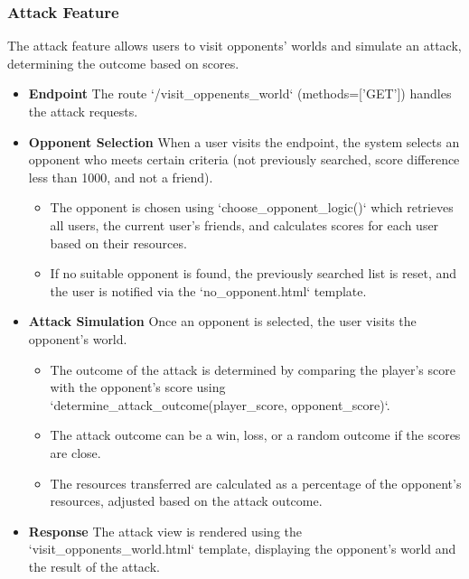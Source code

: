 \documentclass[12pt]{article}
\begin{document}
\subsubsection{Attack Feature}
The attack feature allows users to visit opponents' worlds and simulate an attack, determining the outcome based on scores.
\begin{itemize}
    \item \textbf{Endpoint} The route `/visit\_oppenents\_world` (methods=['GET']) handles the attack requests.
    \item \textbf{Opponent Selection} When a user visits the endpoint, the system selects an opponent who meets certain criteria (not previously searched, score difference less than 1000, and not a friend).
        \begin{itemize}
            \item The opponent is chosen using `choose\_opponent\_logic()` which retrieves all users, the current user's friends, and calculates scores for each user based on their resources.
            \item If no suitable opponent is found, the previously searched list is reset, and the user is notified via the `no\_opponent.html` template.
        \end{itemize}
    \item \textbf{Attack Simulation} Once an opponent is selected, the user visits the opponent's world.
        \begin{itemize}
            \item The outcome of the attack is determined by comparing the player's score with the opponent's score using `determine\_attack\_outcome(player\_score, opponent\_score)`.
            \item The attack outcome can be a win, loss, or a random outcome if the scores are close.
            \item The resources transferred are calculated as a percentage of the opponent's resources, adjusted based on the attack outcome.
        \end{itemize}
    \item \textbf{Response} The attack view is rendered using the `visit\_opponents\_world.html` template, displaying the opponent's world and the result of the attack.
\end{itemize}
\end{document}
